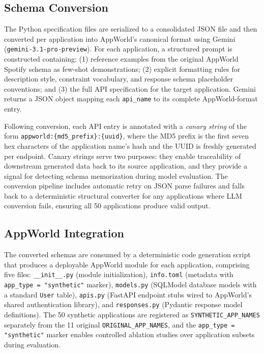 \documentclass[11pt]{article}
\begin{document}
\subsection{Schema Conversion}

The Python specification files are serialized to a consolidated JSON file and then converted per application into AppWorld's canonical format using Gemini (\texttt{gemini-3.1-pro-preview}). For each application, a structured prompt is constructed containing: (1) reference examples from the original AppWorld Spotify schema as few-shot demonstrations; (2) explicit formatting rules for description style, constraint vocabulary, and response schema placeholder conventions; and (3) the full API specification for the target application. Gemini returns a JSON object mapping each \texttt{api\_name} to its complete AppWorld-format entry.

Following conversion, each API entry is annotated with a \emph{canary string} of the form \texttt{appworld:\{md5\_prefix\}:\{uuid\}}, where the MD5 prefix is the first seven hex characters of the application name's hash and the UUID is freshly generated per endpoint. Canary strings serve two purposes: they enable traceability of downstream generated data back to its source application, and they provide a signal for detecting schema memorization during model evaluation. The conversion pipeline includes automatic retry on JSON parse failures and falls back to a deterministic structural converter for any applications where LLM conversion fails, ensuring all 50 applications produce valid output.

\subsection{AppWorld Integration}

The converted schemas are consumed by a deterministic code generation script that produces a deployable AppWorld module for each application, comprising five files: \texttt{\_\_init\_\_.py} (module initialization), \texttt{info.toml} (metadata with \texttt{app\_type = "synthetic"} marker), \texttt{models.py} (SQLModel database models with a standard \texttt{User} table), \texttt{apis.py} (FastAPI endpoint stubs wired to AppWorld's shared authentication library), and \texttt{responses.py} (Pydantic response model definitions). The 50 synthetic applications are registered as \texttt{SYNTHETIC\_APP\_NAMES} separately from the 11 original \texttt{ORIGINAL\_APP\_NAMES}, and the \texttt{app\_type = "synthetic"} marker enables controlled ablation studies over application subsets during evaluation.
\end{document}
